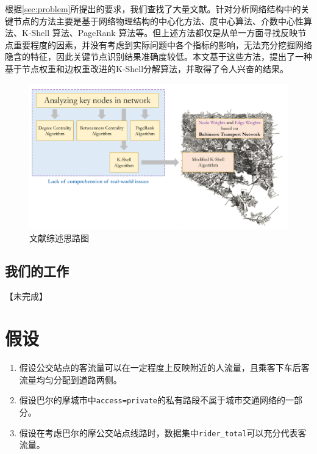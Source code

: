 \documentclass[12pt, a4paper, oneside]{ctexart}
\begin{document}
根据\ref{sec:problem}所提出的要求，我们查找了大量文献。针对分析网络结构中的关键节点的方法主要是基于网络物理结构的中心化方法\citep{ren2014}、度中心算法\citep{zhang2017}、介数中心性算法\citep{bergamini2014}、K-Shell 算法\citep{maji2020}、PageRank 算法\citep{tortosa2021}等。但上述方法都仅是从单一方面寻找反映节点重要程度的因素，并没有考虑到实际问题中各个指标的影响，无法充分挖掘网络隐含的特征，因此关键节点识别结果准确度较低。本文基于这些方法，提出了一种基于节点权重和边权重改进的K-Shell分解算法，并取得了令人兴奋的结果。

\begin{figure}[H]
  \centering
  \includegraphics[width=\textwidth]{figures/zongshu.pdf}
  \caption{文献综述思路图}
  \label{fig:zongshu}
\end{figure}


\subsection{我们的工作}

【未完成】

\section{假设}

\begin{enumerate}
    \item 假设公交站点的客流量可以在一定程度上反映附近的人流量，且乘客下车后客流量均匀分配到道路两侧。
    \item 假设巴尔的摩城市中\texttt{access=private}的私有路段不属于城市交通网络的一部分。
    \item 假设在考虑巴尔的摩公交站点线路时，数据集中\texttt{rider\_total}可以充分代表客流量。
\end{enumerate}
\end{document}
